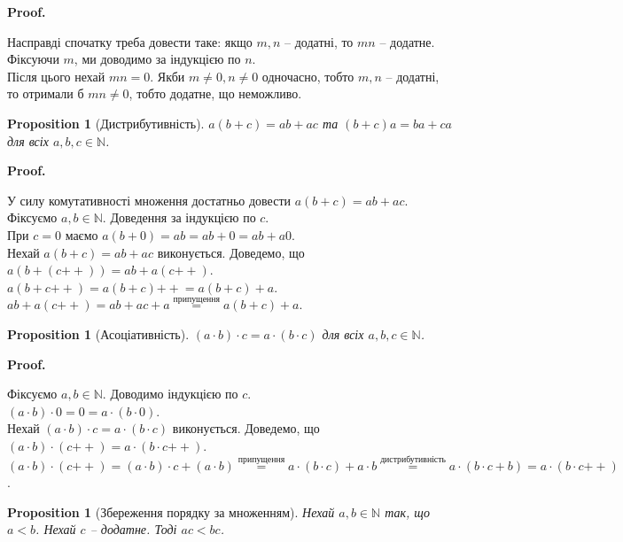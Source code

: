 \documentclass[a4paper, 14pt]{extarticle}
\makeatletter
\theoremstyle{theoremdd}
\theoremstyle{theoremdd}
\theoremstyle{theoremdd}
\theoremstyle{theoremdd}
\theoremstyle{theoremdd}
\theoremstyle{theoremdd}
\theoremstyle{theoremdd}
\theoremstyle{theoremdd}
\theoremstyle{theoremdd}
\theoremstyle{theoremdd}
\newtheorem{proposition}[theorem]{Proposition}
\theoremstyle{theoremdd}
\theoremstyle{theoremdd}
\theoremstyle{theoremdd}
\theoremstyle{theoremdd}
\theoremstyle{theoremdd}
\theoremstyle{theoremdd}
\renewenvironment{proof}[1][Proof.\\]{\par
\pushQED{\hfill \qed}%
\normalfont \topsep6\p@\@plus6\p@\relax
\trivlist
\item\relax
{\bfseries
#1\@addpunct{.}}\hspace\labelsep\ignorespaces
}{%
\popQED\endtrivlist\@endpefalse
}
\newcommand{\plusplus}{\!\!\mathrel{++}}
\makeatother
\begin{document}
\begin{proof}
Насправді спочатку треба довести таке: якщо $m,n$ -- додатні, то $mn$ -- додатне. Фіксуючи $m$, ми доводимо за індукцією по $n$.\\
Після цього нехай $mn = 0$. Якби $m \neq 0, n \neq 0$ одночасно, тобто $m,n$ -- додатні, то отримали б $mn \neq 0$, тобто додатне, що неможливо. 
\end{proof}

\begin{proposition}[Дистрибутивність]
$a(b+c) = ab + ac$ та $(b+c)a = ba + ca$ для всіх $a,b,c \in \mathbb{N}$.
\end{proposition}

\begin{proof}
У силу комутативності множення достатньо довести $a(b+c) = ab + ac$.\\
Фіксуємо $a,b \in \mathbb{N}$. Доведення за індукцією по $c$.\\
При $c = 0$ маємо $a(b+0) = ab = ab + 0 = ab + a0$.\\
Нехай $a(b+c) = ab + ac$ виконується. Доведемо, що $a(b+ (c\plusplus)) = ab + a(c \plusplus)$.\\
$a(b + c\plusplus) = a (b + c) \plusplus = a (b+c) + a$.\\
$ab + a(c \plusplus) = ab + ac + a \overset{\text{припущення}}{=} a(b+c) + a$.
\end{proof}

\begin{proposition}[Асоціативність]
$(a \cdot b) \cdot c = a \cdot (b \cdot c)$ для всіх $a,b,c \in \mathbb{N}$.
\end{proposition}

\begin{proof}
Фіксуємо $a,b \in \mathbb{N}$. Доводимо індукцією по $c$.\\
$(a \cdot b) \cdot 0 = 0 = a \cdot (b \cdot 0)$.\\
Нехай $(a \cdot b) \cdot c = a \cdot (b \cdot c)$ виконується. Доведемо, що $(a \cdot b) \cdot (c \plusplus) = a \cdot (b \cdot c\plusplus)$.\\
$(a \cdot b) \cdot (c \plusplus) = (a \cdot b) \cdot c + (a \cdot b) \overset{\text{припущення}}{=} a \cdot (b \cdot c) + a \cdot b \overset{\text{дистрибутивність}}{=} a \cdot (b \cdot c + b) = a \cdot (b \cdot c \plusplus)$.
\end{proof}

\begin{proposition}[Збереження порядку за множенням]
Нехай $a,b \in \mathbb{N}$ так, що $a < b$. Нехай $c$ -- додатне. Тоді $ac < bc$.
\end{proposition}
\end{document}
